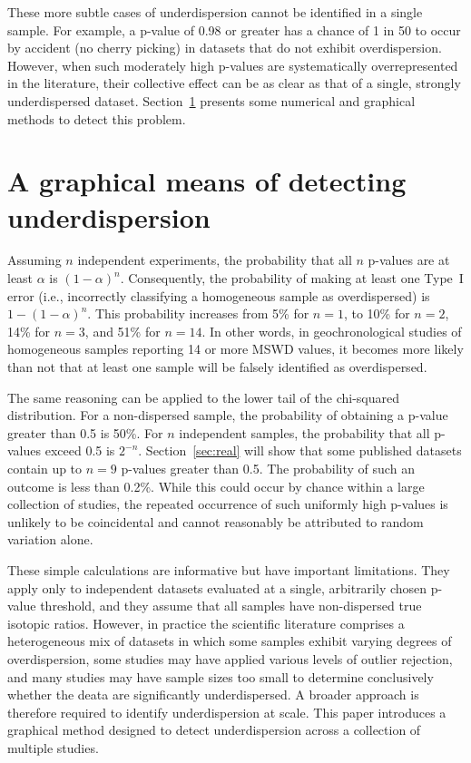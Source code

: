\documentclass{article}
\begin{document}
These more subtle cases of underdispersion cannot be identified in a
single sample. For example, a p-value of 0.98 or greater has a chance
of 1 in 50 to occur by accident (no cherry picking) in datasets that
do not exhibit overdispersion. However, when such moderately high
p-values are systematically overrepresented in the literature, their
collective effect can be as clear as that of a single, strongly
underdispersed dataset. Section~\ref{sec:ecdf} presents some numerical
and graphical methods to detect this problem.

\section{A graphical means of detecting underdispersion}\label{sec:ecdf}

Assuming $n$ independent experiments, the probability that all $n$
p-values are at least $\alpha$ is $(1-\alpha)^n$.  Consequently, the
probability of making at least one Type~I error (i.e., incorrectly
classifying a homogeneous sample as overdispersed) is $1 - (1 -
\alpha)^n$. This probability increases from 5\% for $n = 1$, to 10\%
for $n = 2$, 14\% for $n = 3$, and 51\% for $n = 14$. In other words,
in geochronological studies of homogeneous samples reporting 14 or
more MSWD values, it becomes more likely than not that at least one
sample will be falsely identified as overdispersed.\medskip

The same reasoning can be applied to the lower tail of the chi-squared
distribution. For a non-dispersed sample, the probability of obtaining
a p-value greater than 0.5 is 50\%. For $n$ independent samples, the
probability that all p-values exceed 0.5 is
$2^{-n}$. Section~\ref{sec:real} will show that some published
datasets contain up to $n = 9$ p-values greater than 0.5. The
probability of such an outcome is less than 0.2\%. While this could
occur by chance within a large collection of studies, the repeated
occurrence of such uniformly high p-values is unlikely to be
coincidental and cannot reasonably be attributed to random variation
alone.\medskip

These simple calculations are informative but have important
limitations. They apply only to independent datasets evaluated at a
single, arbitrarily chosen p-value threshold, and they assume that all
samples have non-dispersed true isotopic ratios. However, in practice
the scientific literature comprises a heterogeneous mix of datasets in
which some samples exhibit varying degrees of overdispersion, some
studies may have applied various levels of outlier rejection, and many
studies may have sample sizes too small to determine conclusively
whether the deata are significantly underdispersed. A broader approach is
therefore required to identify underdispersion at scale. This paper
introduces a graphical method designed to detect underdispersion
across a collection of multiple studies.\medskip
\end{document}
